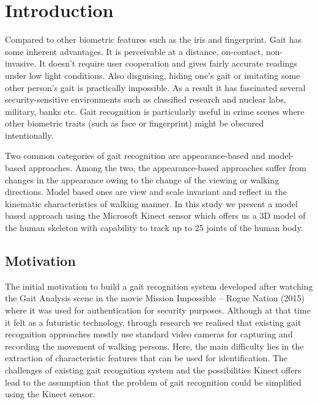 \chapter{Introduction} \label{Introduction}
\noindent Compared to other biometric features such as the iris and fingerprint. Gait has some inherent advantages. It is perceivable at a distance, on-contact, non-invasive. It doesn’t require user cooperation and gives fairly accurate readings under low light conditions. Also disguising, hiding one’s gait or imitating some other person’s gait is practically impossible. As a result it has fascinated several security-sensitive environments such as classified research and nuclear labs, military, banks etc. Gait recognition is particularly useful in crime scenes where other biometric traits (such as face or fingerprint) might be obscured intentionally. 

\noindent Two common categories of gait recognition are appearance-based and model-based approaches. Among the two, the appearance-based approaches suffer from changes in the appearance owing to the change of the viewing or walking directions. Model based ones are view and scale invariant and reflect in the kinematic characteristics of walking manner. In this study we present a model based approach using the Microsoft Kinect sensor which offers us a 3D model of the human skeleton with capability to track up to 25 joints of the human body. 
\section{Motivation}\label{Motivation}
\noindent The initial motivation to build a gait recognition system developed after watching the Gait Analysis scene in the movie Mission Impossible – Rogue Nation (2015) where it was used for authentication for security purposes. Although at that time it felt as a futuristic technology, through research we realised that existing gait recognition approaches mostly use standard video cameras for capturing and recording the movement of walking persons. Here, the main difficulty lies in the extraction of characteristic features that can be used for identification. The challenges of existing gait recognition system and the possibilities Kinect offers lead to the assumption that the problem of gait recognition could be simplified using the Kinect sensor.

